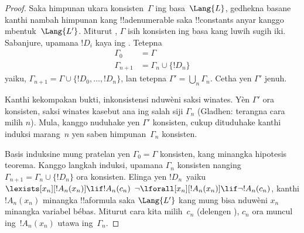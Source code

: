 \documentclass[../../../include/open-logic-section]{subfiles}
\begin{document}
\begin{proof}
Saka himpunan ukara konsisten~$\Gamma$ ing basa~$\Lang{L}$,
gedhekna basane kanthi nambah himpunan kang !!a{denumerable} saka
!!{constant}s anyar kanggo mbentuk~$\Lang{L'}$. Miturut
, $\Gamma$ isih konsisten ing basa kang luwih
sugih iki. Sabanjure, upamana $!D_i$ kaya ing
. Tetepna
\begin{align*}
\Gamma_0 & = \Gamma \\
\Gamma_{n+1} & = \Gamma_n \cup \{!D_n \}
\end{align*}
yaiku, $\Gamma_{n+1} = \Gamma \cup \{ !D_0, \dots, !D_n \}$, lan
tetepna $\Gamma' = \bigcup_{n} \Gamma_n$. Cetha yen $\Gamma'$ jenuh.

Kanthi kekompakan bukti, inkonsistensi nduwèni saksi winates.
Yèn $\Gamma'$ ora konsisten, saksi winates kasebut ana ing
salah siji $\Gamma_n$ (Gladhen: terangna cara milih $n$). Mula, kanggo nuduhake yen
$\Gamma'$ konsisten, cukup dituduhake kanthi induksi marang~$n$ yen
saben himpunan~$\Gamma_n$ konsisten.

Basis induksine mung pratelan yen $\Gamma_0 = \Gamma$ konsisten, kang
minangka hipotesis teorema. Kanggo langkah induksi, upamana
$\Gamma_{n}$ konsisten nanging $\Gamma_{n+1} = \Gamma_n \cup
\{!D_n\}$ ora konsisten. Elinga yen $!D_n$~yaiku
{$\lexists[x_{n}][!A_{n}(x_n)] \lif !A_{n}(c_{n})$}
{$\lnot\lforall[x_{n}][!A_{n}(x_n)] \lif \lnot !A_{n}(c_{n})$},
kanthi $!A_n(x_n)$ minangka !!a{formula} saka $\Lang{L'}$ kang mung
bisa nduwèni $x_n$ minangka variabel bébas. Miturut cara kita milih~$c_n$
(delengen ), $c_n$ ora muncul ing~$!A_n(x_n)$
utawa ing~$\Gamma_n$.


\end{proof}
\end{document}
